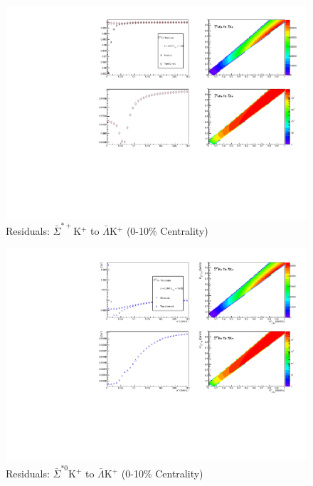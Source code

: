 \documentclass[../AnalysisNoteJBuxton.tex]{subfiles}
\begin{document}
\begin{figure}[h]
  \centering
  \includegraphics[width=\textwidth]{9_AdditionalFigures/Figures/Residuals/ALamKchP/Residuals_ALamKchP_0010_ASigStPKchP_MomResCrctn_NonFlatBgdCrctn_ResidualsIncluded_UsingCoulombOnlyInterpCfs.pdf}
  \caption[Residuals: $\bar{\Sigma}^{*+}$K$^{+}$ to $\bar{\Lambda}$K$^{+}$ (0-10\% Centrality)]{Residuals: $\bar{\Sigma}^{*+}$K$^{+}$ to $\bar{\Lambda}$K$^{+}$ (0-10\% Centrality)}
  \label{fig:Res_ALamKchP_0010_ASigStPKchP}
\end{figure}

\begin{figure}[h]
  \centering
  \includegraphics[width=\textwidth]{9_AdditionalFigures/Figures/Residuals/ALamKchP/Residuals_ALamKchP_0010_ASigSt0KchP_MomResCrctn_NonFlatBgdCrctn_ResidualsIncluded_UsingCoulombOnlyInterpCfs.pdf}
  \caption[Residuals: $\bar{\Sigma}^{*0}$K$^{+}$ to $\bar{\Lambda}$K$^{+}$ (0-10\% Centrality)]{Residuals: $\bar{\Sigma}^{*0}$K$^{+}$ to $\bar{\Lambda}$K$^{+}$ (0-10\% Centrality)}
  \label{fig:Res_ALamKchP_0010_ASigSt0KchP}
\end{figure}
\end{document}
